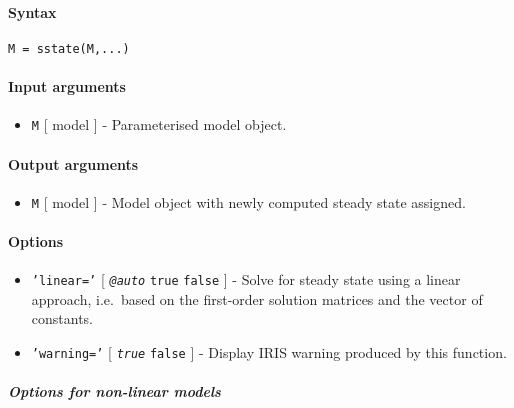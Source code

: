 


	\paragraph{Syntax}\label{syntax}

\begin{verbatim}
M = sstate(M,...)
\end{verbatim}

\paragraph{Input arguments}\label{input-arguments}

\begin{itemize}
\itemsep1pt\parskip0pt
\item
  \texttt{M} {[} model {]} - Parameterised model object.
\end{itemize}

\paragraph{Output arguments}\label{output-arguments}

\begin{itemize}
\itemsep1pt\parskip0pt
\item
  \texttt{M} {[} model {]} - Model object with newly computed steady
  state assigned.
\end{itemize}

\paragraph{Options}\label{options}

\begin{itemize}
\item
  \texttt{'linear='} {[} \emph{\texttt{@auto}} \textbar{} \texttt{true}
  \textbar{} \texttt{false} {]} - Solve for steady state using a linear
  approach, i.e.~based on the first-order solution matrices and the
  vector of constants.
\item
  \texttt{'warning='} {[} \emph{\texttt{true}} \textbar{} \texttt{false}
  {]} - Display IRIS warning produced by this function.
\end{itemize}

\subparagraph{Options for non-linear
models}\label{options-for-non-linear-models}

